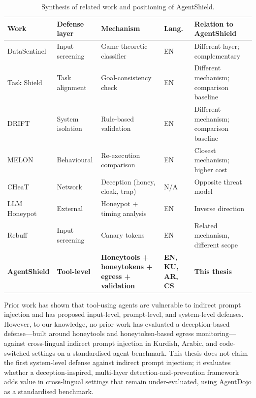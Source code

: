 \begin{table}[H]
\centering
\caption{Synthesis of related work and positioning of AgentShield.}
\label{tab:lit_synthesis}
\begin{small}
\begin{tabularx}{\textwidth}{@{}p{2.2cm} p{1.8cm} X p{1.5cm} p{3.5cm}@{}}
\toprule
\textbf{Work} & \textbf{Defense layer} & \textbf{Mechanism} & \textbf{Lang.} & \textbf{Relation to AgentShield} \\
\midrule
DataSentinel & Input screening & Game-theoretic classifier & EN & Different layer; complementary \\
\addlinespace
Task Shield & Task alignment & Goal-consistency check & EN & Different mechanism; comparison baseline \\
\addlinespace
DRIFT & System isolation & Rule-based validation & EN & Different mechanism; comparison baseline \\
\addlinespace
MELON & Behavioural & Re-execution comparison & EN & Closest mechanism; higher cost \\
\addlinespace
CHeaT & Network & Deception (honey, cloak, trap) & N/A & Opposite threat model \\
\addlinespace
LLM Honeypot & External & Honeypot + timing analysis & EN & Inverse direction \\
\addlinespace
Rebuff & Input screening & Canary tokens & EN & Related mechanism, different scope \\
\addlinespace
\textbf{AgentShield} & \textbf{Tool-level} & \textbf{Honeytools + honeytokens + egress + validation} & \textbf{EN, KU, AR, CS} & \textbf{This thesis} \\
\bottomrule
\end{tabularx}
\end{small}
\end{table}

Prior work has shown that tool-using agents are vulnerable to indirect prompt injection and has proposed input-level, prompt-level, and system-level defenses.  However, to our knowledge, no prior work has evaluated a deception-based defense---built around honeytools and honeytoken-based egress monitoring---against cross-lingual indirect prompt injection in Kurdish, Arabic, and code-switched settings on a standardised agent benchmark.  This thesis does not claim the first system-level defense against indirect prompt injection; it evaluates whether a deception-inspired, multi-layer detection-and-prevention framework adds value in cross-lingual settings that remain under-evaluated, using AgentDojo as a standardised benchmark.
